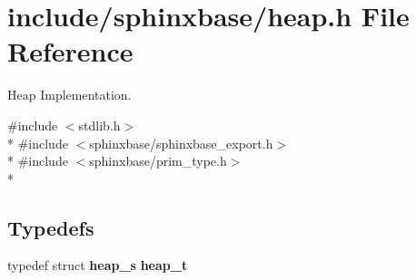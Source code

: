 \section{include/sphinxbase/heap.h File Reference}
\label{heap_8h}


Heap Implementation.  


{\ttfamily \#include $<$stdlib.\+h$>$}\\*
{\ttfamily \#include $<$sphinxbase/sphinxbase\+\_\+export.\+h$>$}\\*
{\ttfamily \#include $<$sphinxbase/prim\+\_\+type.\+h$>$}\\*
\subsection*{Typedefs}
\begin{DoxyCompactItemize}
\item 
typedef struct {\bf heap\+\_\+s} {\bfseries heap\+\_\+t}\label{heap_8h_a0ffa4ec8648c254bf19eee352b69dc7a}

\end{DoxyCompactItemize}
